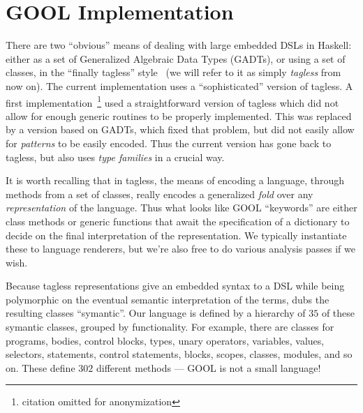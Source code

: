 \documentclass[sigplan,review,anonymous,prologue,dvipsnames]{acmart}
\begin{document}
\section{GOOL Implementation} \label{sec:implementation}

There are two ``obvious'' means of dealing with large embedded DSLs in
Haskell: either as a set of Generalized Algebraic Data Types (GADTs), or
using a set of classes, in the ``finally tagless'' style~\cite{carette2009finally}
(we will refer to it as simply \emph{tagless} from now on).
The current implementation uses a ``sophisticated'' version of tagless. A
first implementation~\footnote{citation omitted for anonymization}
used a straightforward version of tagless
which did not allow for enough generic routines to be properly implemented.
This was replaced by a version based on GADTs, which fixed that problem, but
did not easily allow for \emph{patterns} to be easily encoded. Thus the current
version has gone back to tagless, but also uses \emph{type families} in a crucial
way.

It is worth recalling that in tagless, the means of encoding a language,
through methods from a set of classes, really encodes a generalized
\emph{fold} over any \emph{representation} of the language.  Thus what
looks like GOOL ``keywords'' are either class methods or generic functions
that await the specification of a dictionary to decide on the final
interpretation of the representation.  We typically instantiate these to
language renderers, but we're also free to do various analysis passes if
we wish.

Because tagless representations give an embedded syntax to a DSL while
being polymorphic on the eventual semantic interpretation of the terms,
\cite{carette2009finally} dubs the resulting classes ``symantic''.
Our language is defined by a hierarchy of $35$ of these symantic classes,
grouped by functionality.  For example, there are classes for programs,
bodies, control blocks, types, unary operators, variables, values, selectors,
statements, control statements, blocks, scopes, classes, modules, and so
on.  These define $302$ different methods --- GOOL is not a small language!

\end{document}
